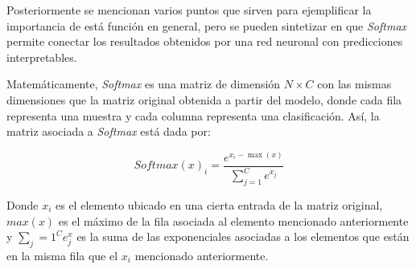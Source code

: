 \documentclass[12pt, letterpaper]{article}
\begin{document}
Posteriormente se mencionan varios puntos que sirven para ejemplificar la importancia de está función en general, pero se pueden sintetizar en que \textit{Softmax} permite
conectar los resultados obtenidos por una red neuronal con predicciones interpretables. 

Matemáticamente, \textit{Softmax} es una matriz de dimensión $N\times C$ con las mismas dimensiones que la matriz original obtenida a partir del modelo, donde cada fila representa una muestra y cada columna representa una clasificación. Así, la matriz asociada a \textit{Softmax} está dada por:

$$\textit{Softmax}(x)_i = \frac{e^{x_i-\max(x)}}{\sum_{j=1}^C e^{x_j}} $$

Donde $x_i$ es el elemento ubicado en una cierta entrada de la matriz original, $max(x)$ es el máximo de la fila asociada al elemento mencionado anteriormente y $\sum_j=1^C e^x_j$ es la suma de las exponenciales asociadas a los elementos que están en la misma fila que el $x_i$ mencionado anteriormente. 
\end{document}
